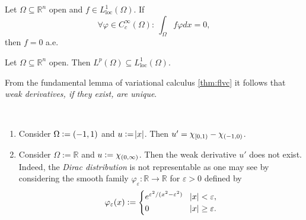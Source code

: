\begin{theorem}
	\label{thm:flvc}
	Let $\Omega \subseteq \mathbb{R}^n$ open and $f \in L^1_{\mathrm{loc}}(\Omega)$. If
	\begin{equation*}
		\forall \varphi \in C^\infty_c(\Omega) : \> \int_\Omega f \varphi dx = 0,
	\end{equation*}
	\noindent then $f = 0$ a.e.
\end{theorem}

\begin{remark}
	Let $\Omega \subseteq \mathbb{R}^n$ open. Then $L^p(\Omega) \subseteq L^1_{\mathrm{loc}}(\Omega)$.
\end{remark}

\begin{remark}
	From the fundamental lemma of variational calculus \ref{thm:flvc} it follows that \emph{weak derivatives, if they exist, are unique}.
\end{remark}

\begin{examples}
	~
	\begin{enumerate}[label = \textup{(}\alph*\textup{)},wide = 0pt]
		\item Consider $\Omega := \intoo{-1,1}$ and $u := \abs{x}$. Then $u' = \chi_{\intco{0,1}} -\chi_{\intoo{-1,0}}$.
		\item Consider $\Omega := \mathbb{R}$ and $u := \chi_{\intoo{0,\infty}}$. Then the weak derivative $u'$ does not exist. Indeed, the \emph{Dirac distribution} is not representable as one may see by considering the smooth family $\varphi_\varepsilon : \mathbb{R} \to \mathbb{R}$ for $\varepsilon > 0$ defined by
			\begin{equation*}
				\varphi_\varepsilon(x) := \begin{cases}
					e^{\varepsilon^2/(x^2 - \varepsilon^2)} & \abs{x} < \varepsilon,\\
					0 & \abs{x} \geq \varepsilon.
				\end{cases}
			\end{equation*}
	\end{enumerate}
\end{examples}

